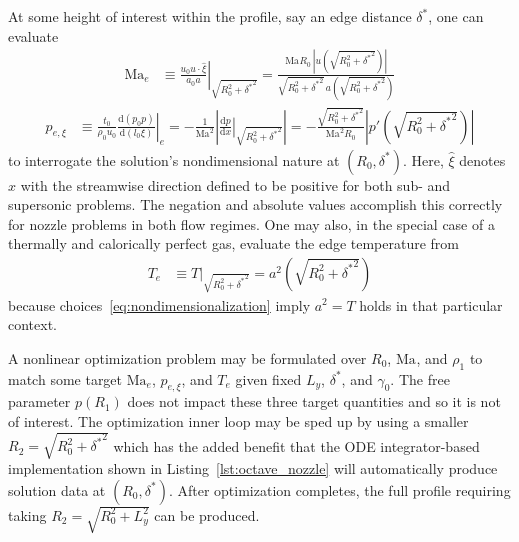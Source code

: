 \documentclass[letterpaper,11pt,nointlimits,reqno]{amsart}
\newcommand{\Mach}[1][]{\ensuremath{\mbox{Ma}_{#1}}}
\begin{document}
At some height of interest within the profile, say an edge distance
$\delta^\ast$, one can evaluate
\begin{align}
  \Mach[e]{}
  &\equiv
  \left.
    \frac{u_0 u\cdot\hat{\xi}}{a_0 a}
  \right|_{\sqrt{R_0^2 + {\delta^\ast}^2}}
  =
  \frac{\Mach R_0 \, \left|u\!\left(\sqrt{R_0^2 + {\delta^\ast}^2}\right)\right|}
       {\sqrt{R_0^2+{\delta^\ast}^2} \, a\!\left(\sqrt{R_0^2 + {\delta^\ast}^2}\right)}
\end{align}
\begin{align}
  p_{e,\xi}
  &\equiv
  \frac{t_0}{\rho_0 u_0}
  \left.
    \frac{\mathrm{d}\left(p_0 p\right)}{\mathrm{d}\left(l_0 \xi\right)}
  \right|_e
  =
  - \frac{1}{\Mach^2} \left|\left.
      \frac{\mathrm{d}p}{\mathrm{d}x}
    \right|_{\sqrt{R_0^2 + {\delta^\ast}^2}}\right|
  =
  -\frac{\sqrt{R_0^2+{\delta^\ast}^2}}{\Mach^2 R_0}
  \left|p'\!\left(\sqrt{R_0^2 + {\delta^\ast}^2}\right)\right|
\end{align}
to interrogate the solution's nondimensional nature at $\left(R_0,
\delta^\ast\right)$.  Here, $\hat{\xi}$ denotes $\hat{x}$ with the streamwise
direction defined to be positive for both sub- and supersonic problems.  The
negation and absolute values accomplish this correctly for nozzle problems in
both flow regimes.  One may also, in the special case of a thermally and
calorically perfect gas, evaluate the edge temperature from
\begin{align}
  T_e
  &\equiv
    T
  \bigr|_{\sqrt{R_0^2 + {\delta^\ast}^2}}
  =
  a^2\!\left(\sqrt{R_0^2 + {\delta^\ast}^2}\right)
\end{align}
because choices~\eqref{eq:nondimensionalization} imply $a^2 = T$ holds in that
particular context.

A nonlinear optimization problem may be formulated over $R_0$, $\Mach$, and
$\rho_1$ to match some target $\Mach[e]{}$, $p_{e,\xi}$, and $T_e$ given fixed
$L_y$, $\delta^\ast$, and $\gamma_0$.  The free parameter $p\!\left(R_1\right)$
does not impact these three target quantities and so it is not of interest.
The optimization inner loop may be sped up by using a smaller $R_2 =
\sqrt{R_0^2 + {\delta^\ast}^2}$ which has the added benefit that the ODE
integrator-based implementation shown in Listing~\ref{lst:octave_nozzle} will
automatically produce solution data at $\left(R_0,\delta^\ast\right)$.  After
optimization completes, the full profile requiring taking $R_2 = \sqrt{R_0^2 +
L_y^2}$ can be produced.

\newcommand*{\doi}[1]{\href{http://dx.doi.org/\detokenize{#1}}{doi: #1}}


\end{document}
